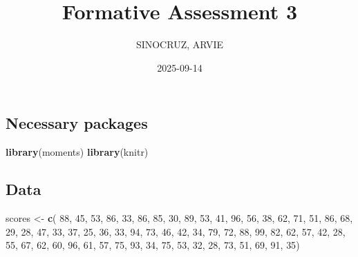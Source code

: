 \documentclass[
]{article}
\title{Formative Assessment 3}
\author{SINOCRUZ, ARVIE}
\date{2025-09-14}
\newenvironment{Shaded}{\begin{snugshade}}{\end{snugshade}}
\newcommand{\DecValTok}[1]{\textcolor[rgb]{0.00,0.00,0.81}{#1}}
\newcommand{\FunctionTok}[1]{\textcolor[rgb]{0.13,0.29,0.53}{\textbf{#1}}}
\newcommand{\NormalTok}[1]{#1}
\newcommand{\OtherTok}[1]{\textcolor[rgb]{0.56,0.35,0.01}{#1}}
\begin{document}
\maketitle

\subsection{Necessary packages}\label{necessary-packages}

\begin{Shaded}
\begin{Highlighting}[]
\FunctionTok{library}\NormalTok{(moments)}
\FunctionTok{library}\NormalTok{(knitr)}
\end{Highlighting}
\end{Shaded}

\subsection{Data}\label{data}

\begin{Shaded}
\begin{Highlighting}[]
\NormalTok{scores }\OtherTok{\textless{}{-}} \FunctionTok{c}\NormalTok{(}
  \DecValTok{88}\NormalTok{, }\DecValTok{45}\NormalTok{, }\DecValTok{53}\NormalTok{, }\DecValTok{86}\NormalTok{, }\DecValTok{33}\NormalTok{, }\DecValTok{86}\NormalTok{, }\DecValTok{85}\NormalTok{, }\DecValTok{30}\NormalTok{, }\DecValTok{89}\NormalTok{, }\DecValTok{53}\NormalTok{, }\DecValTok{41}\NormalTok{, }\DecValTok{96}\NormalTok{, }\DecValTok{56}\NormalTok{, }\DecValTok{38}\NormalTok{, }\DecValTok{62}\NormalTok{,}
  \DecValTok{71}\NormalTok{, }\DecValTok{51}\NormalTok{, }\DecValTok{86}\NormalTok{, }\DecValTok{68}\NormalTok{, }\DecValTok{29}\NormalTok{, }\DecValTok{28}\NormalTok{, }\DecValTok{47}\NormalTok{, }\DecValTok{33}\NormalTok{, }\DecValTok{37}\NormalTok{, }\DecValTok{25}\NormalTok{, }\DecValTok{36}\NormalTok{, }\DecValTok{33}\NormalTok{, }\DecValTok{94}\NormalTok{, }\DecValTok{73}\NormalTok{, }\DecValTok{46}\NormalTok{,}
  \DecValTok{42}\NormalTok{, }\DecValTok{34}\NormalTok{, }\DecValTok{79}\NormalTok{, }\DecValTok{72}\NormalTok{, }\DecValTok{88}\NormalTok{, }\DecValTok{99}\NormalTok{, }\DecValTok{82}\NormalTok{, }\DecValTok{62}\NormalTok{, }\DecValTok{57}\NormalTok{, }\DecValTok{42}\NormalTok{, }\DecValTok{28}\NormalTok{, }\DecValTok{55}\NormalTok{, }\DecValTok{67}\NormalTok{, }\DecValTok{62}\NormalTok{, }\DecValTok{60}\NormalTok{,}
  \DecValTok{96}\NormalTok{, }\DecValTok{61}\NormalTok{, }\DecValTok{57}\NormalTok{, }\DecValTok{75}\NormalTok{, }\DecValTok{93}\NormalTok{, }\DecValTok{34}\NormalTok{, }\DecValTok{75}\NormalTok{, }\DecValTok{53}\NormalTok{, }\DecValTok{32}\NormalTok{, }\DecValTok{28}\NormalTok{, }\DecValTok{73}\NormalTok{, }\DecValTok{51}\NormalTok{, }\DecValTok{69}\NormalTok{, }\DecValTok{91}\NormalTok{, }\DecValTok{35}\NormalTok{)}
\end{Highlighting}
\end{Shaded}
\end{document}
